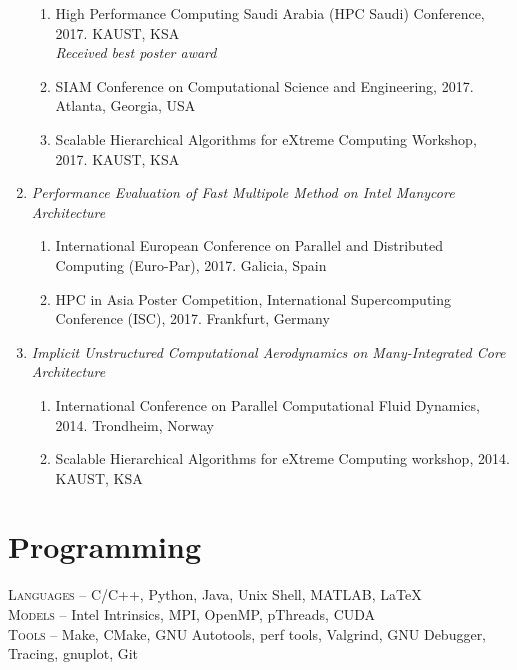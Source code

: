 \documentclass[margin]{resume2}
\begin{document}
\begin{resume}
\begin{enumerate}[leftmargin=*]
\begin{enumerate}[leftmargin=*]
          \item
          High Performance Computing Saudi Arabia (HPC Saudi) Conference, 2017. KAUST, KSA\\
          {\it Received best poster award}
          \item
          SIAM Conference on Computational Science and Engineering, 2017. Atlanta, Georgia, USA
          \item
          Scalable Hierarchical Algorithms for eXtreme Computing Workshop, 2017. KAUST, KSA
        \end{enumerate}
        \item
        {\it Performance Evaluation of Fast Multipole Method on Intel Manycore Architecture}
        \begin{enumerate}[leftmargin=*]
          \item
          International European Conference on Parallel and Distributed Computing (Euro-Par), 2017. Galicia, Spain
          \item
          HPC in Asia Poster Competition, International Supercomputing Conference (ISC), 2017. Frankfurt, Germany
        \end{enumerate}
        \item
      {\it Implicit Unstructured Computational Aerodynamics on Many-Integrated Core Architecture}
        \begin{enumerate}[leftmargin=*]
          \item
          International Conference on Parallel Computational Fluid Dynamics, 2014. Trondheim, Norway
          \item
          Scalable Hierarchical Algorithms for eXtreme Computing workshop, 2014. KAUST, KSA
        \end{enumerate}
    \end{enumerate}

    \section{Programming}
      \textsc{Languages} -- {C/C++, Python, Java, Unix Shell, MATLAB, \LaTeX}\\
      \textsc{Models} -- {Intel Intrinsics, MPI, OpenMP, pThreads, CUDA}\\
      \textsc{Tools} -- {Make, CMake, GNU Autotools, perf tools, Valgrind, GNU Debugger, Tracing, gnuplot, Git}
\end{resume}
\end{document}
